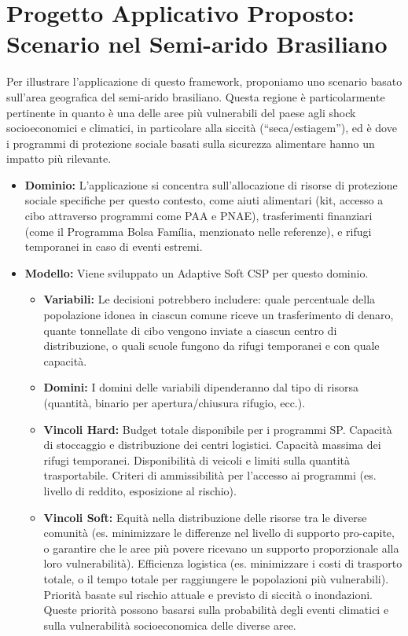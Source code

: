\documentclass[letterpaper]{article}
\begin{document}
\section{Progetto Applicativo Proposto: Scenario nel Semi-arido Brasiliano}
Per illustrare l'applicazione di questo framework, proponiamo uno scenario basato sull'area geografica del semi-arido brasiliano. Questa regione è particolarmente pertinente in quanto è una delle aree più vulnerabili del paese agli shock socioeconomici e climatici, in particolare alla siccità (``seca/estiagem''), ed è dove i programmi di protezione sociale basati sulla sicurezza alimentare hanno un impatto più rilevante.

\begin{itemize}
    \item \textbf{Dominio:} L'applicazione si concentra sull'allocazione di risorse di protezione sociale specifiche per questo contesto, come aiuti alimentari (kit, accesso a cibo attraverso programmi come PAA e PNAE), trasferimenti finanziari (come il Programma Bolsa Família, menzionato nelle referenze), e rifugi temporanei in caso di eventi estremi.

    \item \textbf{Modello:} Viene sviluppato un Adaptive Soft CSP per questo dominio.
          \begin{itemize}
              \item \textbf{Variabili:} Le decisioni potrebbero includere: quale percentuale della popolazione idonea in ciascun comune riceve un trasferimento di denaro, quante tonnellate di cibo vengono inviate a ciascun centro di distribuzione, o quali scuole fungono da rifugi temporanei e con quale capacità.
              \item \textbf{Domini:} I domini delle variabili dipenderanno dal tipo di risorsa (quantità, binario per apertura/chiusura rifugio, ecc.).
              \item \textbf{Vincoli Hard:} Budget totale disponibile per i programmi SP. Capacità di stoccaggio e distribuzione dei centri logistici. Capacità massima dei rifugi temporanei. Disponibilità di veicoli e limiti sulla quantità trasportabile. Criteri di ammissibilità per l'accesso ai programmi (es. livello di reddito, esposizione al rischio).
              \item \textbf{Vincoli Soft:} Equità nella distribuzione delle risorse tra le diverse comunità (es. minimizzare le differenze nel livello di supporto pro-capite, o garantire che le aree più povere ricevano un supporto proporzionale alla loro vulnerabilità). Efficienza logistica (es. minimizzare i costi di trasporto totale, o il tempo totale per raggiungere le popolazioni più vulnerabili). Priorità basate sul rischio attuale e previsto di siccità o inondazioni. Queste priorità possono basarsi sulla probabilità degli eventi climatici e sulla vulnerabilità socioeconomica delle diverse aree.
          \end{itemize}


\end{itemize}
\end{document}
